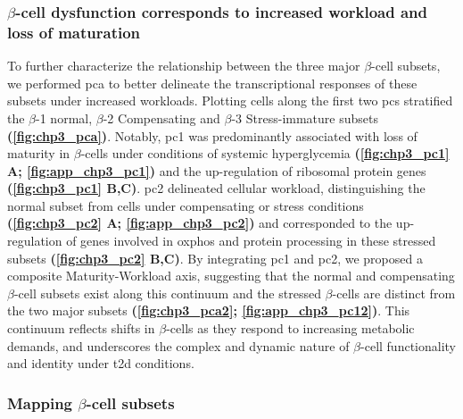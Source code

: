 \subsubsection{$\beta$-cell dysfunction corresponds to increased workload and loss of maturation}

\par To further characterize the relationship between the three major $\beta$-cell subsets, we performed \acrfull{pca} to better delineate the transcriptional responses of these subsets under increased workloads. Plotting cells along the first two \glspl{pc} stratified the $\beta$-1 normal, $\beta$-2 Compensating and $\beta$-3 Stress-immature subsets \textbf{(\autoref{fig:chp3_pca})}. Notably, \gls{pc}1 was predominantly associated with loss of maturity in $\beta$-cells under conditions of systemic hyperglycemia \textbf{(\autoref{fig:chp3_pc1} A; \autoref{fig:app_chp3_pc1})} and the up-regulation of ribosomal protein genes \textbf{(\autoref{fig:chp3_pc1} B,C)}. \gls{pc}2 delineated cellular workload, distinguishing the normal subset from cells under compensating or stress conditions \textbf{(\autoref{fig:chp3_pc2} A; \autoref{fig:app_chp3_pc2})} and corresponded to the up-regulation of genes involved in \acrfull{oxphos} and protein processing in these stressed subsets \textbf{(\autoref{fig:chp3_pc2} B,C)}. By integrating \gls{pc}1 and \gls{pc}2, we proposed a composite Maturity-Workload axis, suggesting that the normal and compensating $\beta$-cell subsets exist along this continuum and the stressed $\beta$-cells are distinct from the two major subsets \textbf{(\autoref{fig:chp3_pca2}; \autoref{fig:app_chp3_pc12})}. This continuum reflects shifts in $\beta$-cells as they respond to increasing metabolic demands, and underscores the complex and dynamic nature of $\beta$-cell functionality and identity under \gls{t2d} conditions.

\subsubsection{Mapping $\beta$-cell subsets}

